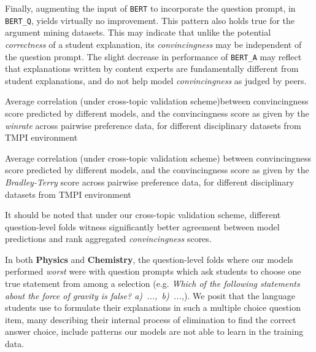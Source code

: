 \documentclass[notitlepage,12pt]{jedm}
\begin{document}
Finally, augmenting the input of \verb|BERT| to incorporate the question 
prompt, in \verb|BERT_Q|, yields virtually no improvement.
This pattern also holds true for the argument mining datasets.
This may indicate that unlike the potential \textit{correctness} of a student 
explanation, its \textit{convincingness} may be independent of the question 
prompt.
The slight decrease in performance of \verb|BERT_A| may reflect that 
explanations written by content experts are fundamentally different from 
student explanations, and do not help model \textit{convincingness} as judged 
by peers.

\begin{table}
	\parbox{.45\linewidth}{
		\centering
	
	}
	\hfill
	\parbox{.45\linewidth}{
		\centering
	
	}
	\caption{
		Average correlation (under cross-topic validation scheme)between 
		convincingness score predicted by different models, and the 
		convincingness score as given by the \textit{winrate} across pairwise 
		preference data, for different disciplinary datasets from TMPI 
		environment
	}
	\label{tab:dalite_winrate}
\end{table}


\begin{table}
	\parbox{.45\linewidth}{
		\centering
		
	}
	\hfill
	\parbox{.45\linewidth}{
		\centering
		
	}
	\caption{
		Average correlation (under cross-topic validation scheme) between 
		convincingness score predicted by different models, and the 
		convincingness score as given by the \textit{Bradley-Terry} score 
		across pairwise preference data, for different disciplinary datasets 
		from TMPI environment
	}
	\label{tab:dalite_BT}
\end{table}

It should be noted that under our cross-topic validation scheme, different 
question-level folds witness significantly better agreement between model 
predictions and rank aggregated \textit{convincingness} scores.

In both \textbf{Physics} and \textbf{Chemistry}, the question-level folds where 
our models performed \textit{worst} were with question prompts which ask 
students to choose one true statement from among a selection (e.g. 
\textit{Which of the following statements about the force of gravity is 
false? \mbox{a) ..., b) ...,}}).
We posit that the language students use to formulate their explanations in such 
a multiple choice question item, many describing their internal process of 
elimination to find the correct answer choice, include patterns our models are 
not able to learn in the training data.
\end{document}
